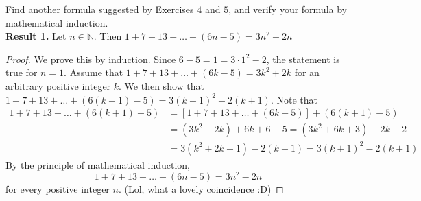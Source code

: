 \documentclass[12pt]{article}
\newcommand{\N}{\mathbb{N}}
\newenvironment{problem}[2][Problem]{\begin{trivlist}
		\item[\hskip \labelsep {\bfseries #1}\hskip \labelsep {\bfseries #2.}]}{\end{trivlist}}
\begin{document}
\begin{problem}{7}
	Find another formula suggested by Exercises $4$ and $5$, and verify your formula by mathematical induction.\\
	
	\textbf{Result 1.} Let $n\in \N$. Then $1+7+13+\ldots+(6n-5) = 3n^{2}-2n$
	\begin{proof}  
		We prove this by induction. Since $6-5=1=3\cdot1^{2}-2$, the statement is true for $n=1$. Assume that $1+7+13+\ldots+(6k-5) = 3k^{2}+2k$ for an arbitrary positive integer $k$. We then show that $1+7+13+\ldots+(6(k+1)-5)=3(k+1)^{2}-2(k+1)$. Note that
		\begin{align*}
			1+7+13+\ldots+(6(k+1)-5) &= [1+7+13+\ldots+(6k-5)]+(6(k+1)-5)\\
			&= (3k^{2}-2k)+6k+6-5 = (3k^{2}+6k+3)-2k-2\\
			&= 3(k^{2}+2k+1)-2(k+1) = 3(k+1)^{2}-2(k+1)
		\end{align*}
	By the principle of mathematical induction, 
	\begin{equation*}
		1+7+13+\ldots+(6n-5) = 3n^{2}-2n
	\end{equation*}
for every positive integer $n$. (Lol, what a lovely coincidence :D)
	\end{proof}
\end{problem}
\end{document}
